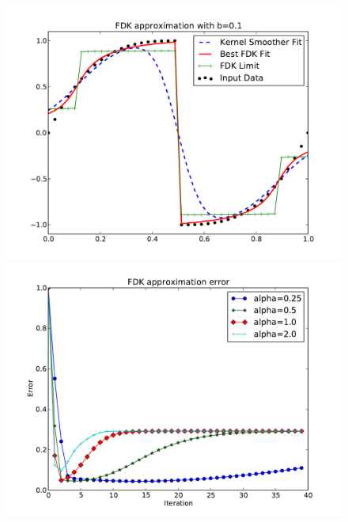 \begin{figure}[!htb]
    \includegraphics[width=\linewidth]{./figs/flip.pdf}
  \endminipage\hfill
    \includegraphics[width=\linewidth]{./figs/fliperr.pdf}
  \endminipage
\end{figure}

